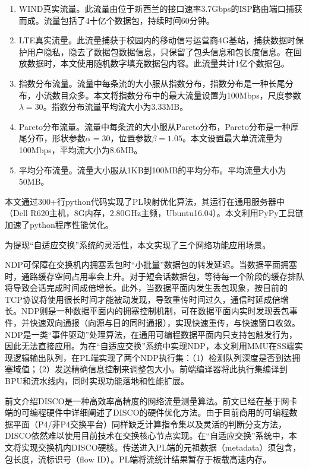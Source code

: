 \begin{enumerate}
	\item WIND真实流量。此流量由位于新西兰的接口速率3.7Gbps的ISP路由端口捕获而成。流量包括了4十亿个数据包，持续时间60分钟。
	\item LTE真实流量。此流量捕获于校园内的移动信号运营商4G基站，捕获数据时保护用户隐私，隐去了数据包数据信息，只保留了包头信息和包长度信息。在回放数据时，本文使用随机数字填充数据包内容。此流量共计1亿个数据包。
	\item 指数分布流量。流量中每条流的大小服从指数分布，指数分布是一种长尾分布，小流数目众多。本文将指数分布中的最大流量设置为100Mbps，尺度参数$\lambda=30$。指数分布流量平均流大小为3.33MB。
	\item Pareto分布流量。流量中每条流的大小服从Pareto分布，Pareto分布是一种厚尾分布，形状参数$\alpha=30$，位置参数$\beta=1.05$。本文设置最大单流流量为100Mbps，平均流大小为8.6MB。
	\item 平均分布流量。流量大小服从1KB到100MB的平均分布。平均流量大小为50MB。
\end{enumerate}

本文通过300+行python代码实现了PL映射优化算法，其运行在通用服务器中（Dell R620主机，8G内存，2.80GHz主频，Ubuntu16.04）。本文利用PyPy工具链加速了python程序性能优化。

为提现“自适应交换”系统的灵活性，本文实现了三个网络功能应用场景。


NDP可保障在交换机内拥塞丢包时“小批量”数据包的转发延迟。当数据平面拥塞时，通路缓存空间占用率会上升。对于短会话数据包，等待每一个阶段的缓存排队将导致会话完成时间成倍增长。此外，当数据平面内发生丢包现象，按目前的TCP协议将使用很长时间才能被动发现，导致重传时间过久，通信时延成倍增长。NDP则是一种数据平面内的拥塞控制机制，可在数据平面内实时发现丢包事件，并快速双向通报（向源与目的同时通报），实现快速重传，与快速窗口收敛。NDP是一类“事件驱动”处理算法，在通用可编程数据平面内只支持包触发行为，因此无法直接应用。为在“自适应交换”系统中实现NDP，本文利用MMU在SS端实现逻辑输出队列，在PL端实现了两个NDP执行集：（1）检测队列深度是否到达拥塞域值；（2）发送精确信息控制来调整包大小。前端编译器将此执行集编译到BPU和流水线内，同时实现功能落地和性能扩展。


前文介绍DISCO是一种高效率高精度的网络流量测量算法。前文已经在基于网卡端的可编程硬件中详细阐述了DISCO的硬件优化方法。由于目前商用的可编程数据平面（P4/非P4交换平台）同样缺乏计算指令集以及灵活的判断分支方法，DISCO依然难以使用目前技术在交换核心节点实现。在“自适应交换”系统中，本文将实现交换机内DISCO硬核。传送进入PL端的元祖数据（metadata）须包含，包长度，流标识号（flow ID）。PL端将流统计结果暂存于板载高速内存。

